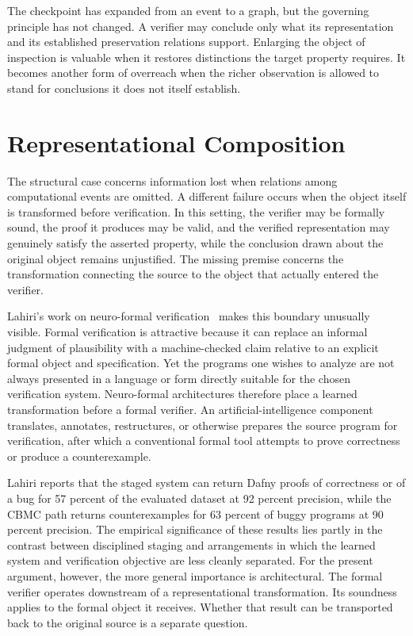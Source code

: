 \documentclass[11pt]{article}
\begin{document}
The checkpoint has expanded from an event to a graph, but the governing principle has not changed. A verifier may conclude only what its representation and its established preservation relations support. Enlarging the object of inspection is valuable when it restores distinctions the target property requires. It becomes another form of overreach when the richer observation is allowed to stand for conclusions it does not itself establish.

\section{Representational Composition}

The structural case concerns information lost when relations among computational events are omitted. A different failure occurs when the object itself is transformed before verification. In this setting, the verifier may be formally sound, the proof it produces may be valid, and the verified representation may genuinely satisfy the asserted property, while the conclusion drawn about the original object remains unjustified. The missing premise concerns the transformation connecting the source to the object that actually entered the verifier.

Lahiri's work on neuro-formal verification~\cite{lahiri2026} makes this boundary unusually visible. Formal verification is attractive because it can replace an informal judgment of plausibility with a machine-checked claim relative to an explicit formal object and specification. Yet the programs one wishes to analyze are not always presented in a language or form directly suitable for the chosen verification system. Neuro-formal architectures therefore place a learned transformation before a formal verifier. An artificial-intelligence component translates, annotates, restructures, or otherwise prepares the source program for verification, after which a conventional formal tool attempts to prove correctness or produce a counterexample.

Lahiri reports that the staged system can return Dafny proofs of correctness or of a bug for 57 percent of the evaluated dataset at 92 percent precision, while the CBMC path returns counterexamples for 63 percent of buggy programs at 90 percent precision. The empirical significance of these results lies partly in the contrast between disciplined staging and arrangements in which the learned system and verification objective are less cleanly separated. For the present argument, however, the more general importance is architectural. The formal verifier operates downstream of a representational transformation. Its soundness applies to the formal object it receives. Whether that result can be transported back to the original source is a separate question.
\end{document}
